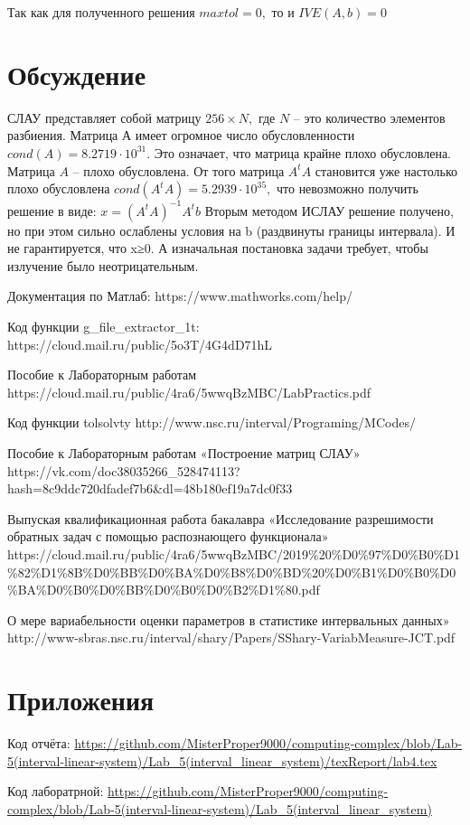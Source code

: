 \documentclass[a4]{article}
\begin{document}
Так как для полученного решения $maxtol=0,$ то и $IVE(A,b)=0$ \hfill\cite{source4}


\section{Обсуждение}
СЛАУ представляет собой матрицу $256\times N,$ где $N$ – это количество элементов разбиения.
Матрица $А$ имеет огромное число обусловленности $cond(A)= 8.2719\cdot 10^{31}.$ Это означает, что матрица крайне плохо обусловлена. 
Матрица $A$ – плохо обусловлена. От того матрица $A^t A$ становится уже настолько плохо обусловлена $cond(A^t A)= 5.2939\cdot 10^{35},$ что невозможно получить решение в виде: $x=(A^t A)^{-1} A^t b$
Вторым методом ИСЛАУ решение получено, но при этом сильно ослаблены условия на b (раздвинуты границы интервала). И не гарантируется, что x≥0. А изначальная постановка задачи требует, чтобы излучение было неотрицательным.



\begin{thebibliography}{}
      Документация по Матлаб: https://www.mathworks.com/help/

     Код функции g\_file\_extractor\_1t: https://cloud.mail.ru/public/5o3T/4G4dD71hL
    
    Пособие к Лабораторным работам https://cloud.mail.ru/public/4ra6/5wwqBzMBC/LabPractics.pdf
    
    Код функции tolsolvty http://www.nsc.ru/interval/Programing/MCodes/
    
    Пособие к Лабораторным работам «Построение матриц СЛАУ» https://vk.com/doc38035266\_528474113?hash=8c9ddc720dfadef7b6\&dl=48b180ef19a7dc0f33
    
    Выпуская квалификационная работа бакалавра «Исследование разрешимости обратных задач с помощью распознающего функционала» https://cloud.mail.ru/public/4ra6/5wwqBzMBC/2019\%20\%D0\%97\%D0\%B0\%D1\%82\%D1\%8B\%D0\%BB\%D0\%BA\%D0\%B8\%D0\%BD\%20\%D0\%B1\%D0\%B0\%D0\%BA\%D0\%B0\%D0\%BB\%D0\%B0\%D0\%B2\%D1\%80.pdf
    
    О мере вариабельности оценки параметров в статистике интервальных данных» http://www-sbras.nsc.ru/interval/shary/Papers/SShary-VariabMeasure-JCT.pdf
    
\end{thebibliography}

\section{Приложения}

Код отчёта:\; \url{https://github.com/MisterProper9000/computing-complex/blob/Lab-5(interval-linear-system)/Lab_5(interval_linear_system)/texReport/lab4.tex}

Код лаборатрной:\; \url{https://github.com/MisterProper9000/computing-complex/blob/Lab-5(interval-linear-system)/Lab_5(interval_linear_system)}
\end{document}
